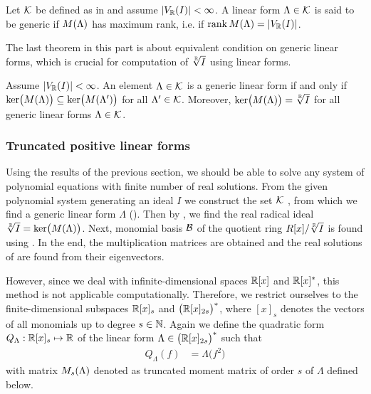 \begin{definition}
  Let $\mathcal{K}$ be defined as in  and assume $|V_{\mathbb{R}}(I)|<\infty$.
  A linear form $\Lambda\in\mathcal{K}$ is said to be generic if $M(\Lambda)$ has maximum rank, i.e. if $\operatorname{rank}M(\Lambda) = |V_{\mathbb{R}}(I)|$.
\end{definition}

The last theorem in this part is about equivalent condition on generic linear forms, which is crucial for computation of $\sqrt[\mathbb{R}]{I}$ using linear forms.

\begin{theorem}
  Assume $|V_{\mathbb{R}}(I)|<\infty$.
  An element $\Lambda\in\mathcal{K}$ is a generic linear form if and only if $\operatorname{ker}\!\big(M(\Lambda)\big)\subseteq \operatorname{ker}\!\big(M(\Lambda^\prime)\big)$ for all $\Lambda^\prime\in\mathcal{K}$.
  Moreover, $\operatorname{ker}\!\big(M(\Lambda)\big) = \sqrt[\mathbb{R}]{I}$ for all generic linear forms $\Lambda\in\mathcal{K}$.
\end{theorem}

\subsubsection{Truncated positive linear forms}
Using the results of the previous section, we should be able to solve any system of polynomial equations with finite number of real solutions.
From the given polynomial system  generating an ideal $I$ we construct the set $\mathcal{K}$ , from which we find a generic linear form $\Lambda$ ().
Then by , we find the real radical ideal $\sqrt[\mathbb{R}]{I} = \operatorname{ker}\!\big(M(\Lambda)\big)$.
Next, monomial basis $\mathcal{B}$ of the quotient ring $R[x]/\sqrt[\mathbb{R}]{I}$ is found using .
In the end, the multiplication matrices are obtained and the real solutions of  are found from their eigenvectors.

However, since we deal with infinite-dimensional spaces $\mathbb{R}[x]$ and $\mathbb{R}[x]^*$, this method is not applicable computationally.
Therefore, we restrict ourselves to the finite-dimensional subspaces $\mathbb{R}[x]_s$ and $\big(\mathbb{R}[x]_{2s}\big)^*$, where $[x]_s$ denotes the vectors of all monomials up to degree $s\in\mathbb{N}$.
Again we define the quadratic form $Q_\Lambda:\mathbb{R}[x]_s\mapsto\mathbb{R}$ of the linear form $\Lambda\in\big(\mathbb{R}[x]_{2s}\big)^*$ such that
\begin{align}
  Q_\Lambda(f) &= \Lambda\big(f^2\big)
\end{align}
with matrix $M_s(\Lambda)$ denoted as truncated moment matrix of order $s$ of $\Lambda$ defined below.

